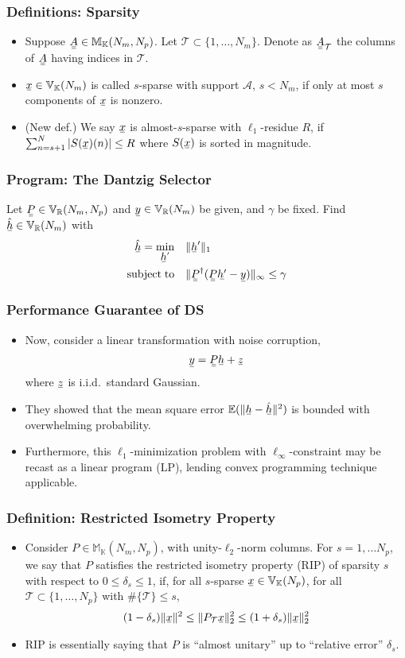 \documentclass{beamer}
\newcommand{\Disp}[1]{\begin{align} #1 \end{align}}
\renewcommand{\H}{\dagger}
\newcommand{\NT}{\notag}
\renewcommand{\d}{\delta}
\newcommand{\I}{\item}
\newcommand{\MB}[1]{\mathbb{#1}}
\newcommand{\MC}[1]{\mathcal{#1}}
\newcommand{\RM}[1]{\mathrm{#1}}
\newcommand{\V}[1]{\stackunder[1.2pt]{$#1$}{\rule{.9ex}{.075ex}}}
\newcommand{\M}[1]{\V{\V{#1}}}
\begin{document}
\begin{frame}
\frametitle{Definitions: Sparsity}
\begin{itemize}
\I Suppose \(\M{A} \in \MB{M}_{\MB{K}} (N_m, N_p)\).
Let \(\MC{T} \subset \{1, \dotsc, N_m\}\).
Denote as \(\M{A}_{\MC{T}}\) the columns of \(\M{A}\) having indices in \(\MC{T}\).
\I \(\V{x} \in \MB{V}_{\MB{K}} (N_m)\) is called \(s\)-sparse with support \(\MC{A}\), \(s <N_m\), if only at most \(s\) components of \(\V{x}\) is nonzero.
\I (New def.) We say \(\V{x}\) is almost-\(s\)-sparse with \(\ell_1\)-residue \(R\), if \( \sum_{n=s+1}^N |S(\V{x}) (n)| \leq R \) where \(S(\V{x})\) is sorted in magnitude.
\end{itemize}
\end{frame}

\begin{frame}
\frametitle{Program: The Dantzig Selector}
Let \(\M{P} \in \MB{V}_\MB{R} (N_m, N_p)\) and \(\V{y} \in \MB{V}_\MB{R} (N_m)\) be given, and \(\gamma\) be fixed.
Find \(\hat{\V{h}} \in \MB{V}_\MB{R} (N_m)\) with
\Disp{
\hat{\V{h}} =\min_{\V{h}'} \quad &\|\V{h}'\|_1 \\ \NT
\RM{subject}\; \RM{to} \quad &\|\M{P}^\H (\M{P} \V{h'} -\V{y})\|_\infty \leq \gamma
}
\end{frame}

\begin{frame}
\frametitle{Performance Guarantee of DS}
\begin{itemize}
\I Now, consider a linear transformation with noise corruption,
\Disp{
\V{y} =\M{P} \V{h} + \V{z}
}
where \(\V{z}\) is i.i.d.\ standard Gaussian.

\I They showed that the mean square error \(\MB{E}(\| \V{h} -\hat{\V{h}} \|^2)\) is bounded with overwhelming probability.

\I Furthermore, this \(\ell_1\)-minimization problem with \(\ell_\infty\)-constraint may be recast as a linear program (LP), lending convex programming technique applicable.
\end{itemize}
\end{frame}

\begin{frame}
\frametitle{Definition: Restricted Isometry Property}
\begin{itemize}
\I Consider \(P \in \MB{M}_{\MB{K}} (N_m, N_p)\), with unity-\(\ell_2\)-norm columns.
For \(s =1, \dotsc N_p\), we say that \(P\) satisfies the restricted isometry property (RIP) of sparsity \(s\) with respect to \(0 \leq \d_s \leq 1\), if, for all \(s\)-sparse \(\V{x} \in \MB{V}_{\MB{K}} (N_p)\), for all \(\MC{T} \subset \{1, \dotsc, N_p\}\) with \(\#\{\MC{T}\} \leq s\),
%
\Disp{
(1-\d_s) \|\V{x}\|^2
\leq \|P_{\MC{T}} \V{x}\|_2^2
\leq (1+\d_s) \|\V{x}\|_2^2
}
\I RIP is essentially saying that \(P\) is ``almost unitary'' up to ``relative error'' \(\d_s\).
\end{itemize}
\end{frame}
\end{document}

